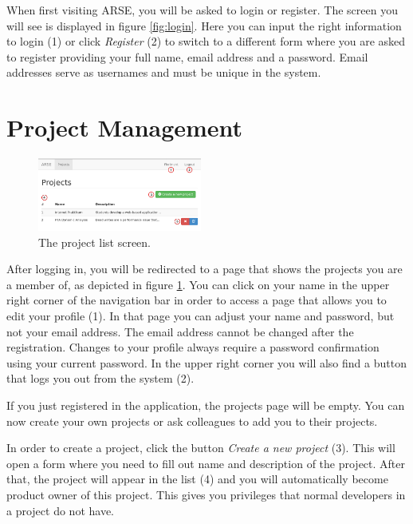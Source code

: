 \documentclass[
	accentcolor=tud1a %
]{tudreport}
\begin{document}
When first visiting ARSE, you will be asked to login or register. The screen you will see is displayed in figure \ref{fig:login}. Here you can input the right information to login (1) or click \emph{Register} (2) to switch to a different form where you are asked to register providing your full name, email address and a password. Email addresses serve as usernames and must be unique in the system.

\section{Project Management}
\label{sec:project-mgmt}

\begin{figure}
	\centering
	\includegraphics[width=0.48\textwidth]{img/projects}
	\caption{The project list screen.}
	\label{fig:project-list}
\end{figure}

After logging in, you will be redirected to a page that shows the projects you are a member of, as depicted in figure \ref{fig:project-list}. You can click on your name in the upper right corner of the navigation bar in order to access a page that allows you to edit your profile (1). In that page you can adjust your name and password, but not your email address. The email address cannot be changed after the registration. Changes to your profile always require a password confirmation using your current password. In the upper right corner you will also find a button that logs you out from the system (2).

If you just registered in the application, the projects page will be empty. You can now create your own projects or ask colleagues to add you to their projects.

In order to create a project, click the button \emph{Create a new project} (3). This will open a form where you need to fill out name and description of the project. After that, the project will appear in the list (4) and you will automatically become product owner of this project. This gives you privileges that normal developers in a project do not have.
\end{document}
